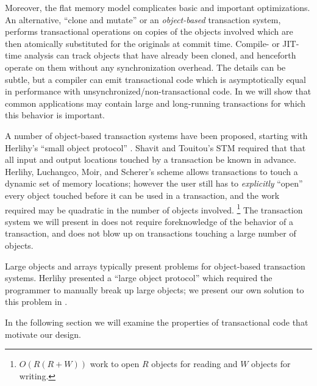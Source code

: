 \documentclass{csa-sig-alternate}
\begin{document}
Moreover, the flat memory model complicates basic and
important optimizations.  An alternative, ``clone and mutate'' or
an \emph{object-based} transaction system, performs transactional
operations on copies
of the objects involved which are then atomically substituted for the
originals at commit time.  Compile- or JIT-time analysis can track
objects that have already been cloned, and henceforth operate on them
without any synchronization overhead.  The details can be subtle, but a
compiler can emit transactional code which is asymptotically equal
in performance with unsynchronized/non-transactional code.  In
 we will show that common applications may contain
large and long-running transactions for which this behavior is
important.

A number of object-based transaction systems have been
proposed, starting with Herlihy's ``small object protocol''
\cite{Herlihy93}.  Shavit and Touitou's STM \cite{ShavitTo95} required that
that all input and output locations touched by a transaction be known
in advance.  Herlihy, Luchangco, Moir, and Scherer's scheme
\cite{HerlihyLuMoSc03} allows transactions to touch a dynamic set of
memory locations; however the user still has to \emph{explicitly} ``open''
every object touched before it can be used in a transaction, and the
work required may be quadratic in the number of objects involved.%
\footnote{$O(R(R+W))$ work to open $R$ objects for reading and $W$
objects for writing.}  The transaction system we will present
in  does not require foreknowledge of the behavior of a
transaction, and does not blow up on transactions touching a large
number of objects.

Large objects and arrays typically present problems for object-based
transaction systems.  Herlihy presented a ``large object
protocol'' \cite{Herlihy93} which required the programmer to manually
break up large objects; we present our own solution to this problem in
.

In the following section we will examine the properties of
transactional code that motivate our design.
\end{document}

